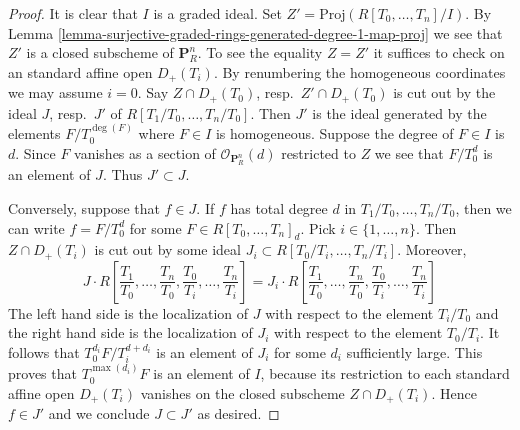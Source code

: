 \documentclass{stacks-project}
\theoremstyle{plain}
\theoremstyle{definition}
\theoremstyle{remark}
\numberwithin{equation}{subsection}
\begin{document}
\begin{proof}
It is clear that $I$ is a graded ideal.
Set $Z' = \text{Proj}(R[T_0, \ldots, T_n]/I)$.
By Lemma \ref{lemma-surjective-graded-rings-generated-degree-1-map-proj}
we see that $Z'$ is a closed subscheme of $\mathbf{P}^n_R$.
To see the equality $Z = Z'$
it suffices to check on an standard affine open
$D_{+}(T_i)$. By renumbering the homogeneous coordinates we
may assume $i = 0$. Say $Z \cap D_{+}(T_0)$, resp.\ $Z' \cap D_{+}(T_0)$
is cut out by the ideal $J$, resp.\ $J'$ of $R[T_1/T_0, \ldots, T_n/T_0]$.
Then $J'$ is the ideal generated by the elements $F/T_0^{\deg(F)}$ where
$F \in I$ is homogeneous.
Suppose the degree of $F \in I$ is $d$. Since $F$ vanishes as a section
of $\mathcal{O}_{\mathbf{P}^n_R}(d)$ restricted to $Z$ we see that
$F/T_0^d$ is an element of $J$. Thus $J' \subset J$.

\medskip\noindent
Conversely, suppose that $f \in J$. If $f$ has total degree
$d$ in $T_1/T_0, \ldots, T_n/T_0$, then we can write
$f = F/T_0^d$ for some $F \in R[T_0, \ldots, T_n]_d$.
Pick $i \in \{1, \ldots, n\}$. Then $Z \cap D_{+}(T_i)$ is
cut out by some ideal $J_i \subset R[T_0/T_i, \ldots, T_n/T_i]$.
Moreover,
$$
J \cdot
R\left[
\frac{T_1}{T_0}, \ldots, \frac{T_n}{T_0},
\frac{T_0}{T_i}, \ldots, \frac{T_n}{T_i}
\right]
=
J_i \cdot
R\left[
\frac{T_1}{T_0}, \ldots, \frac{T_n}{T_0},
\frac{T_0}{T_i}, \ldots, \frac{T_n}{T_i}
\right]
$$
The left hand side is the localization of $J$ with respect to the
element $T_i/T_0$ and the right hand side is the localization of $J_i$
with respect to the element $T_0/T_i$. It follows that
$T_0^{d_i}F/T_i^{d + d_i}$ is an element of $J_i$ for some $d_i$
sufficiently large. This proves that $T_0^{\max(d_i)}F$ is an
element of $I$, because its restriction to each standard affine
open $D_{+}(T_i)$ vanishes on the closed subscheme
$Z \cap D_{+}(T_i)$. Hence $f \in J'$ and we conclude $J \subset J'$
as desired.
\end{proof}
\end{document}
